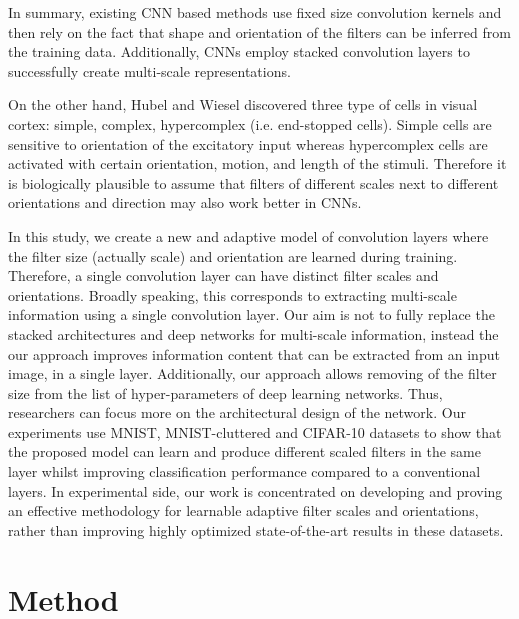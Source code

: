 \documentclass{bmvc2k}
\begin{document}

In summary, existing CNN based methods use fixed size convolution kernels and then rely on the fact that shape and orientation of the filters can be inferred from the training data. Additionally, CNNs employ stacked convolution layers to successfully create multi-scale representations.

On the other hand, Hubel and Wiesel \cite{hubel1968receptive} discovered three type of cells in visual cortex: simple, complex, hypercomplex (i.e. end-stopped cells). Simple cells are sensitive to orientation of the excitatory input whereas hypercomplex cells are activated with certain orientation, motion, and length of the stimuli. Therefore it is biologically plausible to assume that filters of different scales next to different orientations and direction may also work better in CNNs.

In this study, we create a new and adaptive model of convolution layers where the filter size (actually scale) and orientation are learned during training. Therefore, a single convolution layer can have distinct filter scales and orientations. Broadly speaking, this corresponds to extracting multi-scale information using a single convolution layer. Our aim is not to fully replace the stacked architectures and deep networks for multi-scale information, instead the our approach improves information content that can be extracted from an input image, in a single layer. Additionally, our approach allows removing of the filter size from the list of hyper-parameters of deep learning networks. Thus, researchers can focus more on the architectural design of the network. Our experiments use MNIST, MNIST-cluttered and CIFAR-10 datasets to show that the proposed model can learn and produce different scaled filters in the same layer whilst improving classification performance compared to a conventional layers. In experimental side, our work is concentrated on developing and proving an effective methodology for learnable adaptive filter scales and orientations, rather than improving highly optimized state-of-the-art results in these datasets.

\section{Method}
\end{document}
